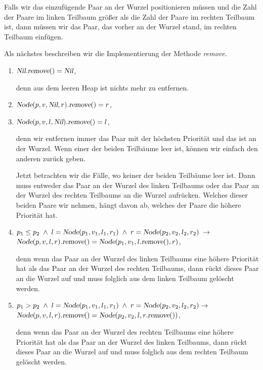 \begin{enumerate}
      Falls wir das einzuf\"ugende Paar an der Wurzel
      positionieren m\"ussen und die Zahl der Paare im linken Teilbaum
      gr\"o{\ss}er als die Zahl der Paare im rechten Teilbaum ist,
      dann m\"ussen wir das Paar, das vorher an der Wurzel stand, im rechten Teilbaum
      einf\"ugen.
\end{enumerate}
Als n\"achstes beschreiben wir die Implementierung der Methode \textsl{remove}.
\begin{enumerate}
\item $\textsl{Nil}.\textsl{remove}() = \textsl{Nil}$,

      denn aus dem leeren Heap ist nichts mehr zu entfernen.
\item $\textsl{Node}(p,v,\textsl{Nil},r).\textsl{remove}() = r$,
  
\item $\textsl{Node}(p,v,l,\textsl{Nil}).\textsl{remove}() = l$,

      denn wir entfernen immer das Paar mit der h\"ochsten Priorit\"at und das ist an der
      Wurzel.  Wenn einer der beiden Teilb\"aume leer ist, k\"onnen wir einfach den anderen
      zur\"uck geben.

      Jetzt betrachten wir die F\"alle, wo keiner der beiden Teilb\"aume leer ist.
      Dann muss entweder das Paar an der Wurzel des linken Teilbaums
      oder das Paar an der Wurzel des rechten Teilbaums an die Wurzel aufr\"ucken.
      Welches dieser beiden Paare wir nehmen, h\"angt davon ab, welches der Paare die h\"ohere
      Priorit\"at hat.
\item $p_1 \leq p_2 \;\wedge\; l = \textsl{Node}(p_1,v_1,l_1,r_1) \;\wedge\; r =
      \textsl{Node}(p_2,v_2,l_2,r_2) \;\rightarrow$ \\[0.1cm] 
      \hspace*{1.3cm} 
      $\textsl{Node}(p,v,l,r).\textsl{remove}() =      \textsl{Node}(p_1,v_1,l.\textsl{remove}(),r)$,

      denn wenn das Paar an der Wurzel des linken Teilbaums eine h\"ohere Priorit\"at hat
      als das Paar an der Wurzel des rechten Teilbaums, dann r\"uckt dieses Paar an
      die Wurzel auf und muss folglich aus dem linken Teilbaum gel\"oscht werden.
\item $p_1 > p_2 \;\wedge\; l = \textsl{Node}(p_1,v_1,l_1,r_1) \;\wedge\; r = \textsl{Node}(p_2,v_2,l_2,r_2) \rightarrow$ \\[0.1cm]
      \hspace*{1.3cm} 
      $\textsl{Node}(p,v,l,r).\textsl{remove}() = \textsl{Node}(p_2,v_2,l,r.\textsl{remove}())$,

      denn wenn das Paar an der Wurzel des rechten Teilbaums eine h\"ohere Priorit\"at hat
      als das Paar an der Wurzel des linken Teilbaums, dann r\"uckt dieses Paar an
      die Wurzel auf und muss folglich aus dem rechten Teilbaum gel\"oscht werden.  
\end{enumerate}
